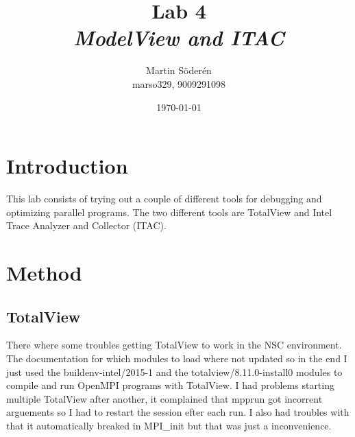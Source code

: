 \documentclass[10pt,twocolumn]{article}
\title{Lab 4\\ \emph{ModelView and ITAC}}
\author{Martin Söderén \\ marso329, 9009291098 }
\date{\today}
\begin{document}
\maketitle

\clearpage

\section{Introduction}

This lab consists of trying out a couple of different tools for debugging and optimizing parallel programs. The two different tools are TotalView and Intel Trace Analyzer and Collector (ITAC). 
\section{Method}
\subsection{TotalView}
There where some troubles getting TotalView to work in the NSC environment. The documentation for which modules to load where not updated so in the end I just used the buildenv-intel/2015-1 and the totalview/8.11.0-install0 modules to compile and run OpenMPI programs with TotalView. I had problems starting multiple TotalView after another, it complained that mpprun got incorrent arguements so I had to restart the session efter each run.  
I also had troubles with that it automatically breaked in MPI\_init but that was just a inconvenience.
\end{document}
